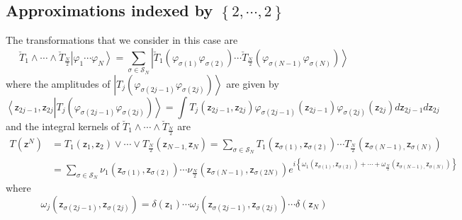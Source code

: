\documentclass[aps,preprint]{revtex4}%
\begin{document}
\subsection{Approximations indexed by $\left\{  2,\cdots,2\right\}  $}

The transformations that we consider in this case are
\begin{equation}
\breve{T}_{1}\wedge\cdots\wedge\breve{T}_{\frac{N}{2}}\left\vert \varphi
_{1}\cdots\varphi_{N}\right\rangle =%
{\displaystyle\sum\limits_{\sigma\in\mathcal{S}_{N}}}
\left\vert \breve{T}_{1}\left(  \varphi_{\sigma\left(  1\right)  }%
\varphi_{\sigma\left(  2\right)  }\right)  \cdots\breve{T}_{\frac{N}{2}%
}\left(  \varphi_{\sigma\left(  N-1\right)  }\varphi_{\sigma\left(  N\right)
}\right)  \right\rangle
\end{equation}
where the amplitudes of $\left\vert T_{j}\left(  \varphi_{\sigma\left(
2j-1\right)  }\varphi_{\sigma\left(  2j\right)  }\right)  \right\rangle $ are
given by
\begin{equation}
\left\langle \mathsf{z}_{2j-1},\mathsf{z}_{2j}\right.  \left\vert T_{j}\left(
\varphi_{\sigma\left(  2j-1\right)  }\varphi_{\sigma\left(  2j\right)
}\right)  \right\rangle =\int T_{j}\left(  \mathsf{z}_{2j-1},\mathsf{z}%
_{2j}\right)  \varphi_{\sigma\left(  2j-1\right)  }\left(  \mathsf{z}%
_{2j-1}\right)  \varphi_{\sigma\left(  2j\right)  }\left(  \mathsf{z}%
_{2j}\right)  d\mathsf{z}_{2j-1}d\mathsf{z}_{2j}%
\end{equation}
and the integral kernels of $\breve{T}_{1}\wedge\cdots\wedge\breve{T}%
_{\frac{N}{2}}$ are
\begin{align}
T\left(  \mathsf{z}^{N}\right)   &  =T_{1}\left(  \mathsf{z}_{1}%
,\mathsf{z}_{2}\right)  \vee\cdots\vee T_{\frac{N}{2}}\left(  \mathsf{z}%
_{N-1,}\mathsf{z}_{N}\right)  =%
{\textstyle\sum\limits_{\sigma\in\mathcal{S}_{N}}}
T_{1}\left(  \mathsf{z}_{\sigma\left(  1\right)  },\mathsf{z}_{\sigma\left(
2\right)  }\right)  \cdots T_{\frac{N}{2}}\left(  \mathsf{z}_{\sigma\left(
N-1\right)  ,}\mathsf{z}_{\sigma\left(  N\right)  }\right) \nonumber\\
&  =\sum_{\sigma\in\mathcal{S}_{N}}\nu_{1}\left(  \mathsf{z}_{\sigma\left(
1\right)  },\mathsf{z}_{\sigma\left(  2\right)  }\right)  \cdots\nu_{\frac
{N}{2}}\left(  \mathsf{z}_{\sigma\left(  N-1\right)  },\mathsf{z}%
_{\sigma\left(  2N\right)  }\right)  e^{i\left\{  \omega_{1}\left(
\mathsf{z}_{\sigma\left(  1\right)  },\mathsf{z}_{\sigma\left(  2\right)
}\right)  +\cdots+\omega_{\frac{N}{2}}\left(  \mathsf{z}_{\sigma\left(
N-1\right)  ,}\mathsf{z}_{\sigma\left(  N\right)  }\right)  \right\}  }%
\end{align}
where
\begin{equation}
\omega_{j}\left(  \mathsf{z}_{\sigma\left(  2j-1\right)  },\mathsf{z}%
_{\sigma\left(  2j\right)  }\right)  =\delta\left(  \mathsf{z}_{1}\right)
\cdots\omega_{j}\left(  \mathsf{z}_{\sigma\left(  2j-1\right)  }%
,\mathsf{z}_{\sigma\left(  2j\right)  }\right)  \cdots\delta\left(
\mathsf{z}_{N}\right)
\end{equation}
\end{document}

